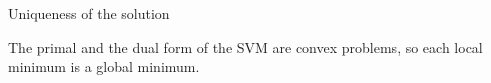 \documentclass[11pt,compress,t,notes=noshow, xcolor=table]{beamer}
\begin{document}
\begin{vbframe}{Uniqueness of the solution}

The primal and the dual form of the SVM are convex problems, so each local minimum is a global minimum.
 \vspace{0.1cm}


\end{vbframe}









\endlecture
\end{document}
